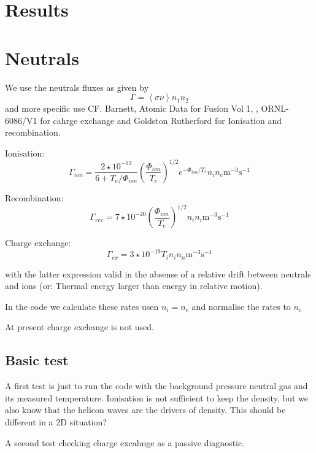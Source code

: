 \documentclass[11pt]{article} %
\begin{document}
\section{Results}


\section{Neutrals}

We use the neutrals fluxes as given by 
$$
\Gamma = \left< \sigma \nu \right> n_1 n_2 
$$
and more specific use CF. Barnett, Atomic Data for Fusion Vol 1, ,
ORNL-6086/V1 for cahrge exchange and Goldston Rutherford for
Ionisation and recombination.


Ionisation:
\begin{equation}
\Gamma_{ion} = \frac{2 \star 10^{-13}}{6 + T_e/\Phi_{ion}}
\left(\frac{\Phi_{ion}}{T_e}\right)^{1/2} e^{-\Phi_{ion}/T_e} n_i n_e \mbox{m}^{-3} \mbox{s}^{-1} 
\end{equation}

Recombination:
\begin{equation}
\Gamma_{rec} = 7 \star 10^{-20}
\left(\frac{\Phi_{ion}}{T_e}\right)^{1/2} n_i n_i\mbox{m}^{-3} \mbox{s}^{-1} 
\end{equation}

Charge exchange:
\begin{equation}
\Gamma_{cx} = 3 \star 10^{-19}
T_i n_i n_n\mbox{m}^{-3} \mbox{s}^{-1} 
\end{equation}

with the latter expression valid in the absense of a relative drift
between neutrals and ions (or: Thermal energy larger than energy in
relative motion).


In the code we calculate these rates usen $n_i = n_e$ and normalise
the rates to $n_e$

At present charge exchange is not used. 


\subsection{Basic test}

A first test is just to run the code with the background pressure
neutral gas and its measured temperature. Ionisation is not sufficient
to keep the density, but we also know that the helicon waves are the
drivers of density. This should be different in a 2D situation? 


A second test checking charge excahnge as a passive diagnostic.
\end{document}
